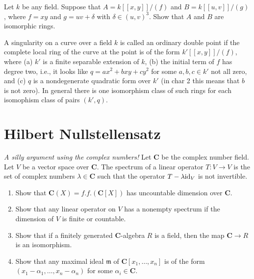\begin{exercise}
\label{exercise-singularities}
Let $k$ be any field. Suppose that $A = k[[x, y]]/(f)$ and
$B = k[[u, v]]/(g)$, where $f = xy$ and $g = uv + \delta$ with
$\delta \in (u, v)^3$. Show that $A$ and $B$ are isomorphic rings.
\end{exercise}

\begin{remark}
\label{remark-singularities}
A singularity on a curve over a field $k$ is called an
ordinary double point if the complete local ring of the curve at the
point is of the form $k'[[x, y]]/(f)$, where (a) $k'$ is a finite separable
extension of $k$, (b) the initial term of $f$ has degree two, i.e., it
looks like $q = ax^2 + bxy + cy^2$ for some $a, b, c\in k'$ not all zero, and
(c) $q$ is a nondegenerate quadratic form over $k'$ (in char 2 this means that
$b$ is not zero). In general there is one isomorphism class of such rings for
each isomophism class of pairs $(k', q)$.
\end{remark}






\section{Hilbert Nullstellensatz}
\label{section-Hilbert-Nullstellensatz}


\begin{exercise}
\label{exercise-uncountable}
{\it A silly argument using the complex numbers!}
Let ${\mathbf C}$ be the complex number field. Let $V$ be a vector
space over ${\mathbf C}$. The spectrum of a linear operator
$T : V \to V$ is the set of complex numbers $\lambda \in {\mathbf C}$
such that the operator $T - \lambda {\rm id}_V$ is not invertible.
\begin{enumerate}
\item Show that ${\mathbf C}(X) = f.f.({\mathbf C}[X])$
has uncountable dimension over ${\mathbf C}$.
\item Show that any linear operator on $V$ has a
nonempty spectrum if the dimension of $V$ is finite or
countable.
\item Show that if a finitely generated ${\mathbf C}$-algebra
$R$ is a field, then the map ${\mathbf C}\to R$ is an isomorphism.
\item Show that any maximal ideal ${\mathfrak m}$ of
${\mathbf C}[x_1, \ldots, x_n]$ is of the form
$(x_1-\alpha_1, \ldots, x_n-\alpha_n)$ for some $\alpha_i \in {\mathbf C}$.
\end{enumerate}
\end{exercise}


